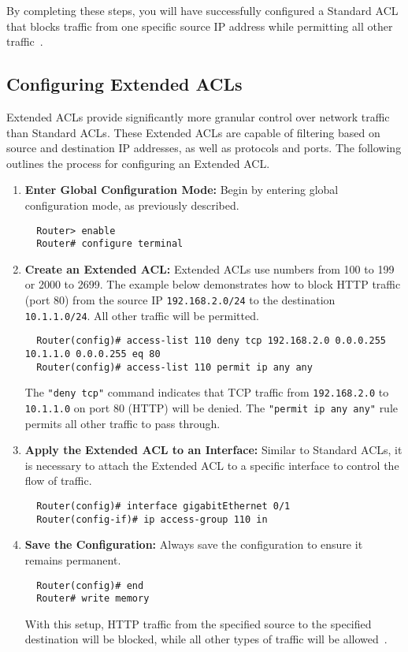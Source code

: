 \documentclass[11pt,a4paper]{article}
\begin{document}
        By completing these steps, you will have successfully configured a Standard ACL that blocks traffic from one specific source IP address while permitting all other traffic~\cite{Configuring-Standard-ACLs}. 

    \subsection*{Configuring Extended ACLs}
        Extended ACLs provide significantly more granular control over network traffic than Standard ACLs. These Extended ACLs are capable of filtering based on source and destination IP addresses, as well as protocols and ports. The following outlines the process for configuring an Extended ACL.
        \begin{enumerate}
           \item \textbf{Enter Global Configuration Mode:} Begin by entering global configuration mode, as previously described.
\begin{lstlisting}
  Router> enable
  Router# configure terminal    
\end{lstlisting}
            \item \textbf{Create an Extended ACL:} Extended ACLs use numbers from 100 to 199 or 2000 to 2699. The example below demonstrates how to block HTTP traffic (port 80) from the source IP \lstinline{192.168.2.0/24} to the destination \lstinline{10.1.1.0/24}. All other traffic will be permitted.

\begin{lstlisting}
  Router(config)# access-list 110 deny tcp 192.168.2.0 0.0.0.255 10.1.1.0 0.0.0.255 eq 80
  Router(config)# access-list 110 permit ip any any    
\end{lstlisting}

            The \lstinline{"deny tcp"} command indicates that TCP traffic from \lstinline{192.168.2.0} to \lstinline{10.1.1.0} on port 80 (HTTP) will be denied. The \lstinline{"permit ip any any"} rule permits all other traffic to pass through.

            \item \textbf{Apply the Extended ACL to an Interface:} Similar to Standard ACLs, it is necessary to attach the Extended ACL to a specific interface to control the flow of traffic.
\begin{lstlisting}
  Router(config)# interface gigabitEthernet 0/1
  Router(config-if)# ip access-group 110 in   
\end{lstlisting}
            \item \textbf{Save the Configuration:} Always save the configuration to ensure it remains permanent.
\begin{lstlisting}
  Router(config)# end
  Router# write memory 
\end{lstlisting}

            With this setup, HTTP traffic from the specified source to the specified destination will be blocked, while all other types of traffic will be allowed~\cite{Configuring-Extended-ACLs}.

        \end{enumerate}
\end{document}
